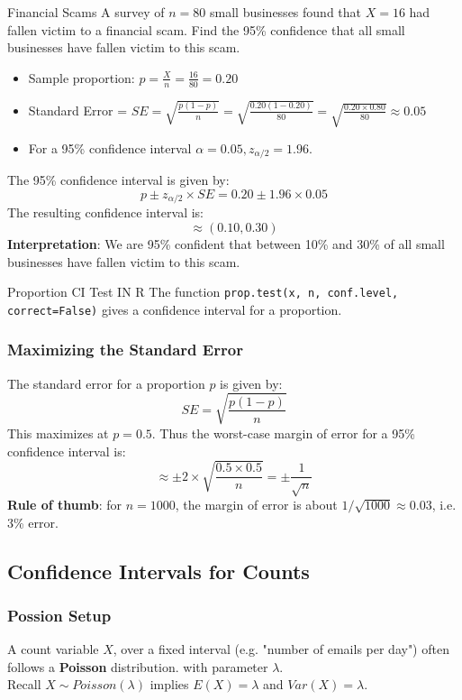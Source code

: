 \documentclass[10pt]{extarticle}
\begin{document}
\begin{examplebox}{Financial Scams}{}
    A survey of $n=80$ small businesses found that $X = 16$ had fallen victim to a financial scam. Find the 95\% confidence that all small businesses have fallen victim to this scam. \\[2ex]

    \begin{itemize}
        \item Sample proportion: $p = \frac{X}{n} = \frac{16}{80} = 0.20$
        \item Standard Error = $SE = \sqrt{\frac{p(1 - p)}{n}} = \sqrt{\frac{0.20(1 - 0.20)}{80}} = \sqrt{\frac{0.20 \times 0.80}{80}} \approx 0.05$
        \item For a 95\% confidence interval $\alpha = 0.05, z_{\alpha/2} = 1.96$.
    \end{itemize}
    The 95\% confidence interval is given by:
    $$p \pm z_{\alpha/2} \times SE = 0.20 \pm 1.96 \times 0.05$$
    The resulting confidence interval is:
    $$\approx (0.10, 0.30)$$
    \textbf{Interpretation}: We are 95\% confident that between 10\% and 30\% of all small businesses have fallen victim to this scam.
\end{examplebox}
\begin{conceptbox}{Proportion CI Test IN R}{}
    The function \texttt{prop.test(x, n, conf.level, correct=False)}  gives a confidence interval for a proportion.
\end{conceptbox}
\pagebreak
\subsubsection{Maximizing the Standard Error}
The standard error for a proportion $p$ is given by:
$$SE = \sqrt{\frac{p(1 - p)}{n}}$$
This maximizes at $p = 0.5$. Thus the worst-case margin of error for a 95\% confidence interval is:
$$\approx \pm 2 \times \sqrt{\frac{0.5\times0.5}{n}} = \pm \frac{1}{\sqrt{n}}$$
\textbf{Rule of thumb}: for $n = 1000$, the margin of error is about $1/\sqrt{1000} \approx 0.03$, i.e. 3\% error.
\subsection{Confidence Intervals for Counts}
\subsubsection{Possion Setup}
A count variable $X$, over a fixed interval (e.g. "number of emails per day") often follows a \textbf{Poisson} distribution. with parameter $\lambda$.  \\
Recall $X \sim Poisson(\lambda)$ implies $E(X) = \lambda$ and $Var(X) = \lambda$.
\end{document}
